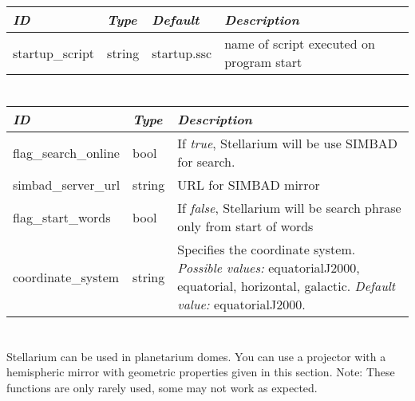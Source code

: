 \section{}\label{sec:config.ini:scripts}

\begin{longtabu} to \textwidth {l|l|l|X}\toprule
\emph{ID}                  & \emph{Type} & \emph{Default} & \emph{Description}\\\midrule
startup\_script                & string & startup.ssc & name of script executed on program start\\\bottomrule 
\end{longtabu}

\section{}\label{sec:config.ini:search}

\begin{longtabu} to \textwidth {l|l|X}\toprule
\emph{ID} & \emph{Type} & \emph{Description}\\\midrule
flag\_search\_online & bool   & If \emph{true}, Stellarium will be use SIMBAD for search.\\\midrule
simbad\_server\_url  & string & URL for SIMBAD mirror\\\midrule
flag\_start\_words   & bool   & If \emph{false}, Stellarium will be search phrase only from start of words\\\midrule
coordinate\_system   & string & Specifies the coordinate system. 
                                \emph{Possible values:} equatorialJ2000, equatorial, horizontal, galactic. \emph{Default value:} equatorialJ2000.\\
\bottomrule
\end{longtabu}

\section{}\label{sec:config.ini:spheric_mirror}

Stellarium can be used in planetarium domes. You can use a projector with a hemispheric mirror with geometric properties given in this section. 
Note: These functions are only rarely used, some may not work as expected.
 
